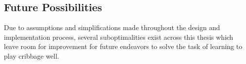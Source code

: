 
\subsection{Future Possibilities}
\label{sec:disc-future}

Due to assumptions and simplifications
made throughout the design and implementation process,
several suboptimalities exist across this thesis
which leave room for improvement for future endeavors to solve the task
of learning to play cribbage well.








